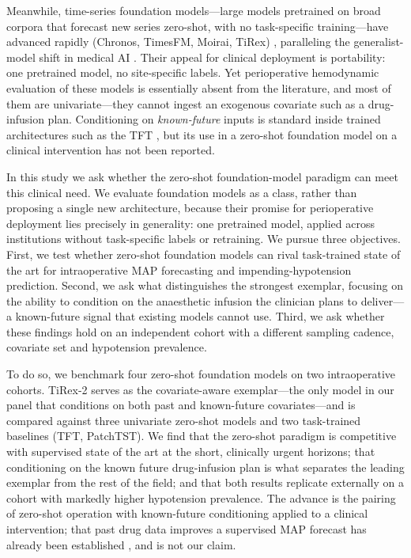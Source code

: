 \documentclass[11pt]{article}
\begin{document}
Meanwhile, time-series foundation models---large models pretrained on broad
corpora that forecast new series zero-shot, with no task-specific
training---have advanced rapidly (Chronos, TimesFM, Moirai, TiRex)
\citep{Ansari2024,Das2024,Woo2024,Auer2025}, paralleling the
generalist-model shift in medical AI \citep{Moor2023}. Their appeal for
clinical deployment is portability: one pretrained model, no site-specific
labels. Yet perioperative hemodynamic evaluation of these models is
essentially absent from the literature, and most of them are
univariate---they cannot ingest an exogenous covariate such as a
drug-infusion plan. Conditioning on \emph{known-future} inputs is standard
inside trained architectures such as the TFT \citep{Lim2021}, but its use in
a zero-shot foundation model on a clinical intervention has not been
reported.

In this study we ask whether the zero-shot foundation-model paradigm can
meet this clinical need. We evaluate foundation models as a class, rather
than proposing a single new architecture, because their promise for
perioperative deployment lies precisely in generality: one pretrained model,
applied across institutions without task-specific labels or retraining. We
pursue three objectives. First, we test whether zero-shot foundation models
can rival task-trained state of the art for intraoperative MAP forecasting
and impending-hypotension prediction. Second, we ask what distinguishes the
strongest exemplar, focusing on the ability to condition on the anaesthetic
infusion the clinician plans to deliver---a known-future signal that
existing models cannot use. Third, we ask whether these findings hold on an
independent cohort with a different sampling cadence, covariate set and
hypotension prevalence.

To do so, we benchmark four zero-shot foundation models on two intraoperative
cohorts. TiRex-2 serves as the covariate-aware exemplar---the only model in
our panel that conditions on both past and known-future covariates---and is
compared against three univariate zero-shot models and two task-trained
baselines (TFT, PatchTST). We find that the zero-shot paradigm is competitive
with supervised state of the art at the short, clinically urgent horizons;
that conditioning on the known future drug-infusion plan is what separates the
leading exemplar from the rest of the field; and that both results replicate
externally on a cohort with markedly higher hypotension prevalence. The
advance is the pairing of zero-shot operation with known-future
conditioning applied to a clinical intervention; that past drug data
improves a supervised MAP forecast has already been established
\citep{Kapral2024}, and is not our claim.
\end{document}
